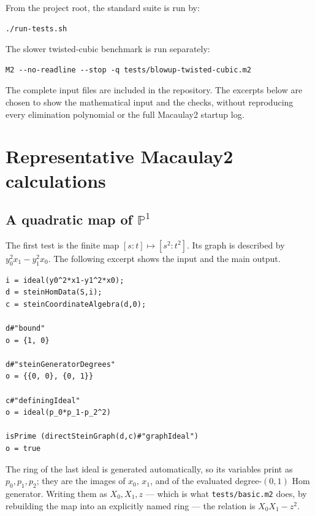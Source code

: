 \documentclass[11pt,reqno]{amsart}
\newcommand{\PP}{\ensuremath{\mathbb{P}}}
\theoremstyle{plain}
\theoremstyle{definition}
\begin{document}
From the project root, the standard suite is run by:

\begin{verbatim}
./run-tests.sh
\end{verbatim}

The slower twisted-cubic benchmark is run separately:

\begin{verbatim}
M2 --no-readline --stop -q tests/blowup-twisted-cubic.m2
\end{verbatim}

The complete input files are included in the repository. The excerpts
below are chosen to show the mathematical input and the checks, without
reproducing every elimination polynomial or the full Macaulay2 startup
log.

\section{Representative Macaulay2 calculations}\label{sec:examples}

\subsection{\texorpdfstring{A quadratic map of \(\PP^1\)}%
                           {A quadratic map of P1}}\label{sec:quadratic}

The first test is the finite map \([s:t]\mapsto[s^2:t^2]\). Its graph is
described by \(y_0^2x_1-y_1^2x_0\). The following excerpt shows the
input and the main output.

\begin{verbatim}
i = ideal(y0^2*x1-y1^2*x0);
d = steinHomData(S,i);
c = steinCoordinateAlgebra(d,0);

d#"bound"
o = {1, 0}

d#"steinGeneratorDegrees"
o = {{0, 0}, {0, 1}}

c#"definingIdeal"
o = ideal(p_0*p_1-p_2^2)

isPrime (directSteinGraph(d,c)#"graphIdeal")
o = true
\end{verbatim}

The ring of the last ideal is generated automatically, so its variables
print as \(p_0,p_1,p_2\); they are the images of \(x_0\), \(x_1\), and
of the evaluated degree-\((0,1)\) Hom generator. Writing them as
\(X_0,X_1,z\) --- which is what \texttt{tests/basic.m2} does, by
rebuilding the map into an explicitly named ring --- the relation is
\(X_0X_1-z^2\).
\end{document}
